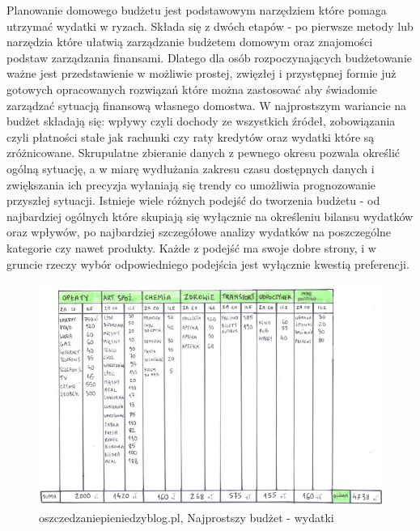 \documentclass[a4paper, 10pt, twoside, openright]{report}
\begin{document}
\begin{large}
{Planowanie domowego budżetu jest podstawowym narzędziem które pomaga utrzymać 
wydatki w ryzach. Składa się z dwóch etapów - po pierwsze metody lub narzędzia 
które ułatwią zarządzanie budżetem domowym oraz znajomości podstaw zarządzania 
finansami. Dlatego dla osób rozpoczynających budżetowanie ważne jest 
przedstawienie w możliwie prostej, zwięzłej i przystępnej formie już gotowych 
opracowanych rozwiązań które można zastosować aby świadomie zarządzać sytuacją 
finansową własnego domostwa. W najprostszym wariancie na 
budżet 
\cite{o24_budzetowanie}\cite{budget}\cite{iwućbudżet}\cite{mintbudget}\cite{ingbudżet}\cite{budzetdomowypodkontrola}
 składają się: wpływy czyli dochody ze wszystkich źródeł, zobowiązania czyli 
płatności stałe jak rachunki czy raty kredytów oraz wydatki które są 
zróżnicowane. Skrupulatne zbieranie danych z pewnego okresu pozwala określić 
ogólną sytuację, a w miarę wydłużania zakresu czasu dostępnych danych i 
zwiększania ich precyzja wyłaniają się trendy co umożliwia prognozowanie 
przyszłej sytuacji. Istnieje wiele różnych podejść do tworzenia budżetu - od 
najbardziej ogólnych które skupiają się wyłącznie na określeniu bilansu wydatków
 oraz wpływów, po najbardziej szczegółowe analizy wydatków na poszczególne 
kategorie czy nawet produkty. Każde z podejść ma swoje dobre strony, i w gruncie
 rzeczy wybór odpowiedniego podejścia jest wyłącznie kwestią preferencji.}

\begin{figure}[H]           %
    \centering
    \includegraphics[width=12cm]{figures/oszczedzaniepieniedzyblog-pl_wydatki.jpg}
    \caption{oszczedzaniepieniedzyblog.pl, Najprostszy budżet - wydatki}
    \label{fig:prostybudżetwydatki}
\end{figure}


\end{large}
\end{document}
